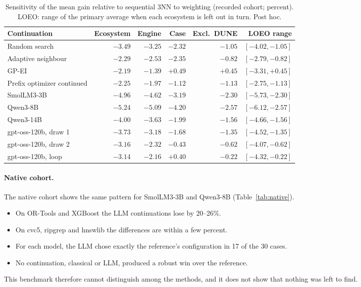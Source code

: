 \begin{table}[t]
\centering
\caption{Sensitivity of the mean gain relative to sequential 3NN to weighting (recorded cohort; percent). LOEO: range of the primary average when each ecosystem is left out in turn. Post hoc.}
\label{tab:weights}
\small
\begin{tabular}{lrrrrr}
\toprule
Continuation & Ecosystem & Engine & Case & Excl.\ DUNE & LOEO range \\
\midrule
Random search & $-3.49$ & $-3.25$ & $-2.32$ & $-1.05$ & $[-4.02, -1.05]$ \\
Adaptive neighbour & $-2.29$ & $-2.53$ & $-2.35$ & $-0.82$ & $[-2.79, -0.82]$ \\
GP-EI & $-2.19$ & $-1.39$ & $+0.49$ & $+0.45$ & $[-3.31, +0.45]$ \\
Prefix optimizer continued & $-2.25$ & $-1.97$ & $-1.12$ & $-1.13$ & $[-2.75, -1.13]$ \\
\midrule
SmolLM3-3B & $-4.96$ & $-4.62$ & $-3.19$ & $-2.30$ & $[-5.73, -2.30]$ \\
Qwen3-8B & $-5.24$ & $-5.09$ & $-4.20$ & $-2.57$ & $[-6.12, -2.57]$ \\
Qwen3-14B & $-4.00$ & $-3.63$ & $-1.99$ & $-1.56$ & $[-4.66, -1.56]$ \\
gpt-oss-120b, draw 1 & $-3.73$ & $-3.18$ & $-1.68$ & $-1.35$ & $[-4.52, -1.35]$ \\
gpt-oss-120b, draw 2 & $-3.16$ & $-2.32$ & $-0.43$ & $-0.62$ & $[-4.07, -0.62]$ \\
gpt-oss-120b, loop & $-3.14$ & $-2.16$ & $+0.40$ & $-0.22$ & $[-4.32, -0.22]$ \\
\bottomrule
\end{tabular}
\end{table}

\paragraph{Native cohort.} The native cohort shows the same pattern for SmolLM3-3B and Qwen3-8B (Table~\ref{tab:native}).
\begin{itemize}
  \item On OR-Tools and XGBoost the LLM continuations lose by 20--26\%.
  \item On cvc5, ripgrep and hnswlib the differences are within a few percent.
  \item For each model, the LLM chose exactly the reference's configuration in 17 of the 30 cases.
  \item No continuation, classical or LLM, produced a robust win over the reference.
\end{itemize}
This benchmark therefore cannot distinguish among the methods, and it does not show that nothing was left to find.

